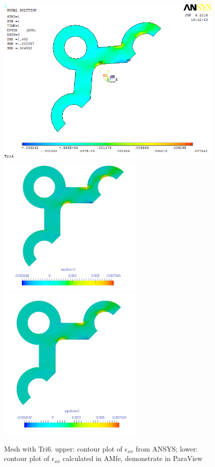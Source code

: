 \begin{figure}[htbp]
	\begin{center}
		\includegraphics[width=11cm,clip]{Tri6_Exx.png} 	
		\includegraphics[width=7cm,clip]{Tri6_Exx_PD.png} 		
		\includegraphics[width=7cm,clip]{Tri6_Exx_P.png} 		
		\caption{Mesh with Tri6. upper: contour plot of $\epsilon_{xx}$ from ANSYS; lower: contour plot of $\epsilon_{xx}$ calculated in AMfe, demonstrate in ParaView} \label{fig: Tri6_Exx}
	\end{center}
\end{figure}
\clearpage 

